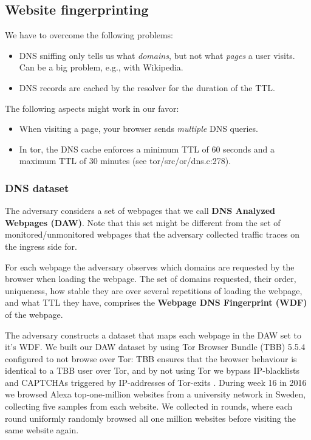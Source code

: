 \subsection{Website fingerprinting}
We have to overcome the following problems:
\begin{itemize}
	\item DNS sniffing only tells us what \emph{domains}, but not what
		\emph{pages} a user visits.  Can be a big problem, e.g., with Wikipedia.
	\item DNS records are cached by the resolver for the duration of the TTL.
\end{itemize}

The following aspects might work in our favor:
\begin{itemize}
	\item When visiting a page, your browser sends \emph{multiple} DNS queries.
	\item In tor, the DNS cache enforces a minimum TTL of 60 seconds and a maximum
	TTL of 30 minutes (see tor/src/or/dns.c:278).
\end{itemize}


\subsubsection{DNS dataset}

The adversary considers a set of webpages that we call \textbf{DNS
Analyzed Webpages (DAW)}. Note that this set might be different from the
set of monitored/unmonitored webpages that the adversary collected
traffic traces on the ingress side for.

For each webpage the adversary observes which domains are requested by
the browser when loading the webpage. The set of domains requested,
their order, uniqueness, how stable they are over several repetitions of
loading the webpage, and what TTL they have, comprises the
\textbf{Webpage DNS Fingerprint (WDF)} of the webpage.

The adversary constructs a dataset that maps each webpage in the DAW set
to it's WDF. We built our DAW dataset by using Tor Browser Bundle (TBB) 5.5.4
configured to not browse over Tor: TBB ensures that the browser behaviour is
identical to a TBB user over Tor, and by not using Tor we bypass IP-blacklists
and CAPTCHAs triggered by IP-addresses of Tor-exits \cite{Khattak2016a}.
During week 16 in 2016 we browsed Alexa top-one-million websites from a
university network in Sweden, collecting five samples from each website. We
collected in rounds, where each round uniformly randomly browsed all one
million websites before visiting the same website again. 


